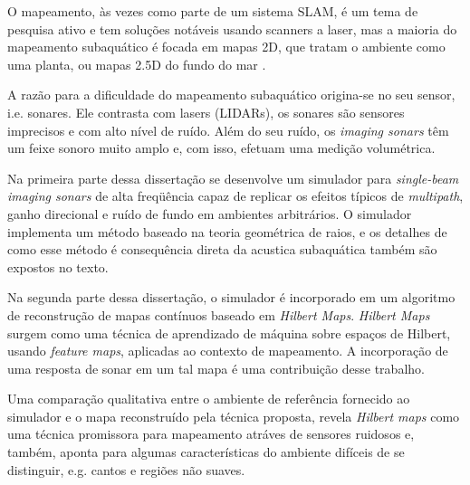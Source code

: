 O mapeamento, \`as vezes como parte de um sistema SLAM, \'e um tema de pesquisa
ativo e tem solu\c{c}\~oes not\'aveis usando scanners a laser, mas a maioria
do mapeamento subaqu\'atico \'e focada em mapas 2D, que tratam o ambiente como
uma planta, ou mapas 2.5D do fundo do mar .

A raz\~ao para a dificuldade do mapeamento subaqu\'atico origina-se no seu
sensor, i.e. sonares. Ele contrasta com lasers (LIDARs), os sonares s\~ao
sensores imprecisos e com alto n\'ivel de ru\'ido. Al\'em do seu ru\'ido, os
\textit{imaging sonars} t\^em um feixe sonoro muito amplo e, com isso, efetuam
uma medi\c{c}\~ao volum\'etrica.

Na primeira parte dessa disserta\c{c}\~ao se desenvolve um simulador para
\textit{single-beam imaging sonars} de alta freqü\^encia capaz de replicar os efeitos t\'ipicos de
\textit{multipath}, ganho direcional e ru\'ido de fundo em ambientes
arbitr\'arios.
O simulador implementa um m\'etodo baseado na teoria geom\'etrica de raios,
e os detalhes de como esse m\'etodo \'e consequ\^encia direta da acustica
subaqu\'atica também são expostos no texto.

Na segunda parte dessa disserta\c{c}\~ao, o simulador \'e incorporado em um
algoritmo de reconstrução de mapas cont\'inuos baseado em \textit{Hilbert Maps}.
\textit{Hilbert Maps} surgem como uma técnica de aprendizado de máquina sobre
espa\c{c}os de Hilbert, usando \textit{feature maps}, aplicadas ao contexto de
mapeamento. A incorpora\c{c}\~ao de uma resposta de sonar em um tal
mapa \'e uma contribui\c{c}\~ao desse trabalho.

Uma compara\c{c}\~ao qualitativa entre o ambiente de referência fornecido ao
simulador e o mapa reconstru\'ido pela técnica proposta, revela \textit{Hilbert
maps} como uma t\'ecnica promissora para mapeamento atráves de sensores ruidosos e, tamb\'em, aponta para
algumas caracter\'isticas do ambiente dif\'iceis de se distinguir, e.g. cantos
e regiões não suaves.

